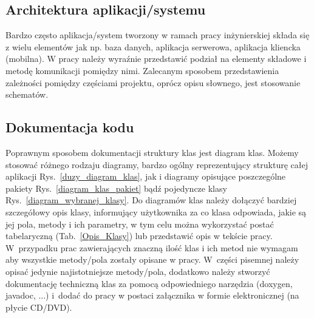 \documentclass[12pt,a4paper]{article}
\begin{document}
\subsection{Architektura aplikacji/systemu}
Bardzo często aplikacja/system tworzony w ramach pracy inżynierskiej składa się z wielu elementów jak np. baza danych, aplikacja serwerowa, aplikacja kliencka (mobilna). W pracy należy wyraźnie przedstawić podział na elementy składowe i metodę komunikacji pomiędzy nimi. Zalecanym sposobem przedstawienia zależności pomiędzy częściami projektu, oprócz opisu słownego, jest stosowanie schematów.

\subsection{Dokumentacja kodu}
 Poprawnym sposobem dokumentacji struktury klas jest diagram klas. Możemy stosować różnego rodzaju diagramy, bardzo ogólny reprezentujący strukturę całej aplikacji Rys.~\ref{duzy_diagram_klas}, jak i diagramy opisujące poszczególne pakiety Rys.~\ref{diagram_klas_pakiet} bądź pojedyncze klasy Rys.~\ref{diagram_wybranej_klasy}. Do diagramów klas należy dołączyć bardziej szczegółowy opis klasy, informujący użytkownika za co klasa odpowiada, jakie są jej pola, metody i ich parametry, w tym celu można wykorzystać postać tabelaryczną (Tab.~\ref{Opis_Klasy}) lub przedstawić opis w tekście pracy. W~przypadku prac zawierających znaczną ilość klas i ich metod nie wymagam aby wszystkie metody/pola zostały opisane w pracy. W~części  pisemnej należy opisać jedynie najistotniejsze metody/pola, dodatkowo należy stworzyć dokumentację techniczną klas za pomocą odpowiedniego narzędzia (doxygen, javadoc, ...) i~dodać do pracy w postaci załącznika w formie elektronicznej (na płycie CD/DVD).
\end{document}
